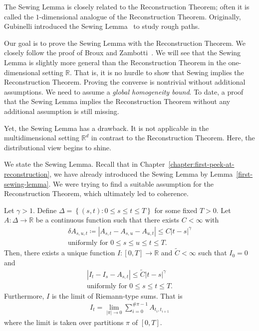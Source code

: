 The Sewing Lemma is closely related to the Reconstruction Theorem; often it is called the \( 1 \)-dimensional analogue of the Reconstruction Theorem. Originally, Gubinelli introduced the Sewing Lemma~\cite{GUBINELLI200486} to study rough paths.

Our goal is to prove the Sewing Lemma with the Reconstruction Theorem. We closely follow the proof of Broux and Zambotti~\cite[Chapter 5]{broux2021sewing}. We will see that the Sewing Lemma is slightly more general than the Reconstruction Theorem in the one-dimensional setting \( \mathbb{R} \). That is, it is no hurdle to show that Sewing implies the Reconstruction Theorem. Proving the converse is nontrivial without additional assumptions. We need to assume a \emph{global homogeneity bound}. To date, a proof that the Sewing Lemma implies the Reconstruction Theorem without any additional assumption is still missing. 

Yet, the Sewing Lemma has a drawback. It is not applicable in the multidimensional setting \( \mathbb{R}^d \) in contrast to the Reconstruction Theorem. Here, the distributional view begins to shine.

We state the Sewing Lemma. Recall that in Chapter~\ref{chapter:first-peek-at-reconstruction}, we have already introduced the Sewing Lemma by Lemma~\ref{first-sewing-lemma}. We were trying to find a suitable assumption for the Reconstruction Theorem, which ultimately led to coherence.

\begin{lemma}
  Let \(\gamma > 1\). Define \( \Delta = \left \{ (s,t) :  0 \leq s \leq t \leq T\right \} \) for some fixed \(T > 0\). Let \(A: \Delta \to \mathbb{R}\) be a continuous function such that there exists \( C <\infty \) with
  \begin{gather*}
      \delta A_{s,u,t} \coloneqq |A_{s,t} - A_{s,u} - A_{u,t}| \leq C  {|t-s|}^\gamma \\
      \text{uniformly for \(0 \leq s \leq u \leq t \leq T\)}. \nonumber
  \end{gather*} 
  Then, there exists a unique function \(I: [0,T] \to \mathbb{R}\) and \(\tilde C < {\infty}\)  such that \(I_0 = 0\) and 
  \begin{gather*}
      |I_t - I_s - A_{s,t}| \leq \tilde C|t-s|^\gamma \\
      \text{uniformly for \(0 \leq s \leq t \leq T\).}
  \end{gather*}  
  Furthermore, \(I\) is the limit of Riemann-type sums. That is 
  \begin{align*}
    I_t =  \lim\limits_{|\pi| \to 0} \sum\limits_{i=0}^{\# \pi - 1} A_{t_i,t_{i+1}}
  \end{align*}
  where the limit is taken over partitions \( \pi \) of \( [0,T] \).
\end{lemma}

